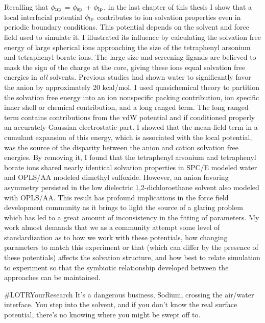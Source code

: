 \begin{conclude}
  Recalling that $\phi_{\mathrm{np}}$ = $\phi_{\mathrm{sp}}$ + $\phi_{\mathrm{lp}}$, in the last chapter of this thesis I show that a local interfacial potential
  $\phi_{\mathrm{lp}}$ contributes to ion solvation properties even in periodic boundary conditions. This potential depends on the solvent and force field 
  used to simulate it. I illustrated its influence by calculating the solvation free energy of large spherical ions approaching the size of the
  tetraphenyl arsonium and tetraphenyl borate ions. The large size and screening ligands are believed to mask the sign of the charge at the core, giving 
  these ions equal solvation free energies in \emph{all} solvents. Previous studies had shown water to significantly favor the anion by approximately
  20 kcal/mol. I used quasichemical theory to partition the solvation free energy into an ion nonspecific packing contribution, ion specific inner shell
  or chemical contribution, and a long ranged term. The long ranged term contains contributions from the vdW potential and if conditioned properly an
  accurately Gaussian electrostatic part. I showed that the mean-field term in a cumulant expansion of this energy, which is associated with the local
  potential, was the source of the disparity between the anion and cation solvation free energies. By removing it, I found that the tetraphenyl arsonium 
  and tetraphenyl borate ions shared nearly identical solvation properties in SPC/E modeled water and OPLS/AA modeled dimethyl sulfoxide. However, 
  an anion favoring asymmetry persisted in the low dielectric 1,2-dichloroethane solvent also modeled with OPLS/AA. This result has profound implications
  in the force field development community as it brings to light the source of a glaring problem which has led to a great amount of inconsistency in 
  the fitting of parameters. My work almost demands that we as a community attempt some level of standardization as to how we work with these potentials,
  how changing parameters to match this experiment or that (which can differ by the presence of these potentials) affects the solvation structure, and
  how best to relate simulation to experiment so that the symbiotic relationship developed between the approaches can be maintained.
  
  \vspace{12mm}  
  
  \begin{wbepi}{\#LOTRYourResearch}
   It's a dangerous business, Sodium, crossing the air/water interface. You step into the solvent, and if you don't know the real surface potential, 
   there's no knowing where you might be swept off to.
  \end{wbepi}
 

\end{conclude}

